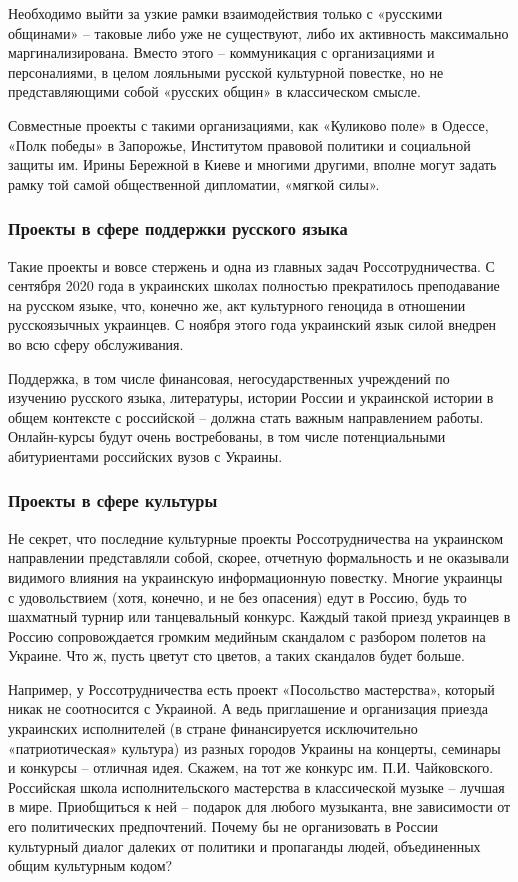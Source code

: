 Необходимо выйти за узкие рамки взаимодействия только с «русскими общинами» –
таковые либо уже не существуют, либо их активность максимально
маргинализирована. Вместо этого – коммуникация с организациями и персоналиями,
в целом лояльными русской культурной повестке, но не представляющими собой
«русских общин» в классическом смысле.

Совместные проекты с такими организациями, как «Куликово поле» в Одессе, «Полк
победы» в Запорожье, Институтом правовой политики и социальной защиты им. Ирины
Бережной в Киеве и многими другими, вполне могут задать рамку той самой
общественной дипломатии, «мягкой силы». 

\subsubsection{Проекты в сфере поддержки русского языка}

Такие проекты и вовсе стержень и одна из главных задач Россотрудничества. С
сентября 2020 года в украинских школах полностью прекратилось преподавание на
русском языке, что, конечно же, акт культурного геноцида в отношении
русскоязычных украинцев. С ноября этого года украинский язык силой внедрен во
всю сферу обслуживания.

Поддержка, в том числе финансовая, негосударственных учреждений по изучению
русского языка, литературы, истории России и украинской истории в общем
контексте с российской – должна стать важным направлением работы. Онлайн-курсы
будут очень востребованы, в том числе потенциальными абитуриентами российских
вузов с Украины. 

\subsubsection{Проекты в сфере культуры}

Не секрет, что последние культурные проекты Россотрудничества на украинском
направлении представляли собой, скорее, отчетную формальность и не оказывали
видимого влияния на украинскую информационную повестку. Многие украинцы с
удовольствием (хотя, конечно, и не без опасения) едут в Россию, будь то
шахматный турнир или танцевальный конкурс. Каждый такой приезд украинцев в
Россию сопровождается громким медийным скандалом с разбором полетов на Украине.
Что ж, пусть цветут сто цветов, а таких скандалов будет больше.

Например, у Россотрудничества есть проект «Посольство мастерства», который
никак не соотносится с Украиной. А ведь приглашение и организация приезда
украинских исполнителей (в стране финансируется исключительно «патриотическая»
культура) из разных городов Украины на концерты, семинары и конкурсы – отличная
идея. Скажем, на тот же конкурс им. П.И. Чайковского. Российская школа
исполнительского мастерства в классической музыке – лучшая в мире. Приобщиться
к ней – подарок для любого музыканта, вне зависимости от его политических
предпочтений. Почему бы не организовать в России культурный диалог далеких от
политики и пропаганды людей, объединенных общим культурным кодом?

